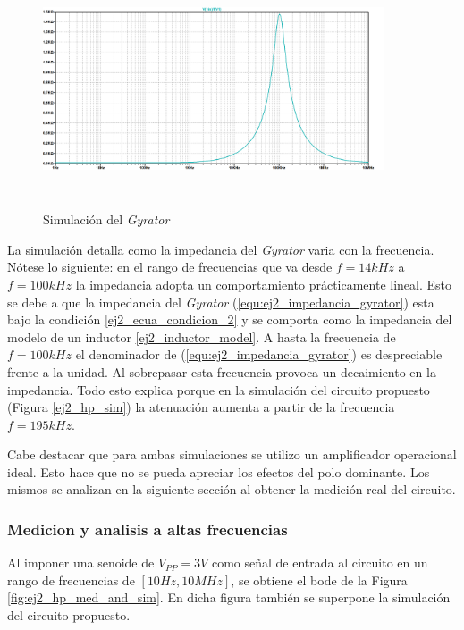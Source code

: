 \begin{figure}[h!]                                                       
    \centering\includegraphics[width=0.9\textwidth, height=7cm]{../Ex2/Resources/ej2_hp_gyrator_sim.png}
    \caption{Simulación del \textit{Gyrator} }
    \label{fig:ej2_HP_gyrator_sim}
    \end{figure}

La simulación detalla como la impedancia del \textit{Gyrator} varia con la frecuencia. Nótese lo siguiente: en el rango de frecuencias que va desde $f = 14 kHz$ a $f = 100 kHz$ la impedancia adopta un comportamiento prácticamente lineal. Esto se debe a que la impedancia del \textit{Gyrator} (\ref{equ:ej2_impedancia_gyrator}) esta bajo la condición \ref{ej2_ecua_condicion_2} y se comporta como la impedancia del modelo de un inductor \ref{ej2_inductor_model}. A hasta la frecuencia de $f=100kHz$ el denominador de (\ref{equ:ej2_impedancia_gyrator}) es despreciable frente a la unidad. Al sobrepasar esta frecuencia provoca un decaimiento en la impedancia. Todo esto explica porque en la simulación del circuito propuesto (Figura \ref{ej2_hp_sim}) la atenuación aumenta a partir de la frecuencia $f = 195 kHz$. 

Cabe destacar que para ambas simulaciones se utilizo un amplificador operacional ideal. Esto hace que no se pueda apreciar los efectos del polo dominante. Los mismos se analizan en la siguiente sección al obtener la medición real del circuito. 

\subsubsection{Medicion y analisis a altas frecuencias}

Al imponer una senoide de $V_{PP} = 3V$ como señal de entrada al circuito en un rango de frecuencias de $[10Hz , 10MHz]$, se obtiene el bode de la Figura \ref{fig:ej2_hp_med_and_sim}. En dicha figura también se superpone la simulación del circuito propuesto.  


